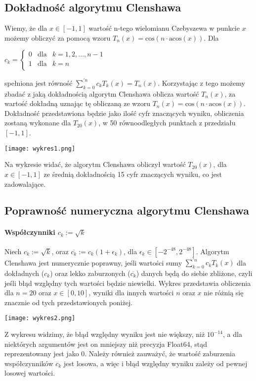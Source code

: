 \documentclass[10pt]{article}
\begin{document}
\subsection{Dokładność algorytmu Clenshawa}
Wiemy, że dla $x \in [-1,1]$ wartość n-tego wielomianu Czebyszewa w punkcie $x$ możemy obliczyć za pomocą wzoru $T_{n}(x) = \textrm{cos} (n \cdot \textrm{acos} (x))$. Dla
\begin{center}
$c_{k}=\left\{
\begin{array}{ccc}
0&\mbox{dla}&k = {1,2,...,n-1}\\
1&\mbox{dla}&k = n\\
\end{array}
\right.$
\end{center}
spełniona jest równość $\sum_{k=0}^{'n} c_{k} T_{k}(x) = T_{n}(x)$. Korzystając z tego możemy zbadać z jaką dokładnością algorytm Clenshawa oblicza wartość $T_{n}(x)$, za wartość dokładną uznając tę obliczaną ze wzoru $T_{n}(x) = \textrm{cos} (n \cdot \textrm{acos} (x))$. Dokładność przedstawiona będzie jako ilość cyfr znaczących wyniku, obliczenia zostaną wykonane dla $T_{20}(x)$, w 50 równoodległych punktach z przedziału $[-1,1]$.
\begin{center}
\texttt{[image: wykres1.png]}
\end{center}
Na wykresie widać, że algorytm Clenshawa obliczył wartość $T_{20}(x)$, dla \\ $x \in [-1,1]$ ze średnią dokładnością 15 cyfr znaczących wyniku, co jest zadowalające. 

\subsection{Poprawność numeryczna algorytmu Clenshawa}
\paragraph{Współczynniki $c_{k} := \sqrt{k}$}
Niech $c_{k} := \sqrt{k}$, oraz $\overline{c_{k}} := c_{k} (1 + \epsilon_{k}) $, dla $ \epsilon_{k} \in [-2^{-48}, 2^{-48}]$. Algorytm Clenshawa jest numerycznie poprawny, jeśli wartości sumy  $\sum_{k=0}^{'n} c_{k} T_{k}(x)$ dla dokładnych ($c_{k}$) oraz lekko zaburzonych ($\overline{c_{k}}$) danych będą do siebie zbliżone, czyli jeśli błąd względny tych wartości będzie niewielki. Wykres przedstawia obliczenia dla $n=20$ oraz $x \in [0,10]$, wyniki dla innych wartości $n$ oraz $x$ nie różnią się znacznie od tych przedstawionych poniżej.
\begin{center}
\texttt{[image: wykres2.png]}
\end{center}
Z wykresu widzimy, że błąd względny wyniku jest nie większy, niż $10^{-14}$, a dla niektórych argumentów jest on mniejszy niż precyzja Float64, stąd reprezentowany jest jako $0$. Należy również zauważyć, że wartość zaburzenia współczynników $c_{k}$ jest losowa, a więc i błąd względny wyniku zależy od pewnej losowej wartości.\\
\end{document}
